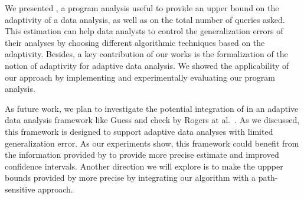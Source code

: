We presented {\THESYSTEM}, a program analysis useful to provide an upper bound on the adaptivity of a data analysis, as well as on the total number of queries asked. This estimation can help data analysts to control the generalization errors of their analyses by choosing different algorithmic techniques based on the adaptivity. Besides, a key contribution of our works is the formalization of the notion of adaptivity for adaptive data analysis. We showed the applicability of our approach by implementing and experimentally evaluating our program analysis.

As future work, we plan to investigate the potential integration of  {\THESYSTEM} in an adaptive data analysis framework like Guess and check by Rogers at al.~\cite{RogersRSSTW20}. As we discussed, this framework is  designed to support adaptive data analyses with limited generalization error. As our experiments show, this framework could benefit from the information provided by {\THESYSTEM} to provide more precise estimate and improved confidence intervals. Another direction we will explore is to make 
the uppper bounds provided by {\THESYSTEM} more precise by integrating our algorithm with a path-sensitive approach.



